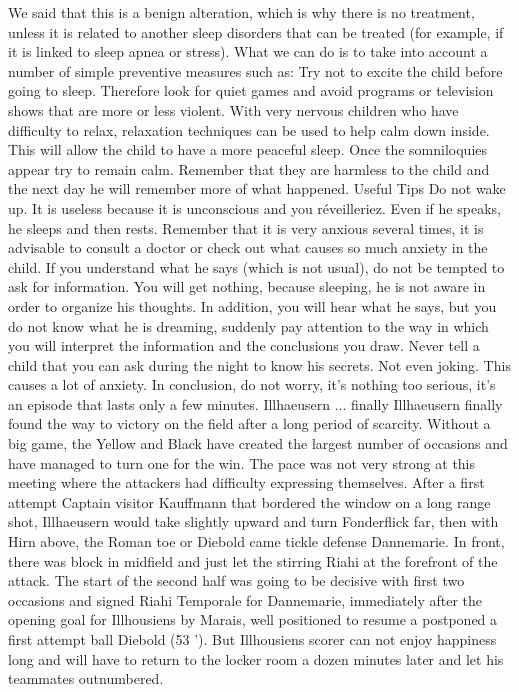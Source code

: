 We said that this is a benign alteration, which is why there is no treatment, unless it is related to another sleep disorders that can be treated (for example, if it is linked to sleep apnea or stress).
What we can do is to take into account a number of simple preventive measures such as:
Try not to excite the child before going to sleep.
Therefore look for quiet games and avoid programs or television shows that are more or less violent.
With very nervous children who have difficulty to relax, relaxation techniques can be used to help calm down inside.
This will allow the child to have a more peaceful sleep.
Once the somniloquies appear try to remain calm.
Remember that they are harmless to the child and the next day he will remember more of what happened.
Useful Tips
Do not wake up.
It is useless because it is unconscious and you réveilleriez.
Even if he speaks, he sleeps and then rests.
Remember that it is very anxious several times, it is advisable to consult a doctor or check out what causes so much anxiety in the child.
If you understand what he says (which is not usual), do not be tempted to ask for information.
You will get nothing, because sleeping, he is not aware in order to organize his thoughts.
In addition, you will hear what he says, but you do not know what he is dreaming, suddenly pay attention to the way in which you will interpret the information and the conclusions you draw.
Never tell a child that you can ask during the night to know his secrets.
Not even joking.
This causes a lot of anxiety.
In conclusion, do not worry, it's nothing too serious, it's an episode that lasts only a few minutes.
Illhaeusern ... finally
Illhaeusern finally found the way to victory on the field after a long period of scarcity.
Without a big game, the Yellow and Black have created the largest number of occasions and have managed to turn one for the win.
The pace was not very strong at this meeting where the attackers had difficulty expressing themselves.
After a first attempt Captain visitor Kauffmann that bordered the window on a long range shot, Illhaeusern would take slightly upward and turn Fonderflick far, then with Hirn above, the Roman toe or Diebold came tickle defense Dannemarie.
In front, there was block in midfield and just let the stirring Riahi at the forefront of the attack.
The start of the second half was going to be decisive with first two occasions and signed Riahi Temporale for Dannemarie, immediately after the opening goal for Illhousiens by Marais, well positioned to resume a postponed a first attempt ball Diebold (53 ').
But Illhousiens scorer can not enjoy happiness long and will have to return to the locker room a dozen minutes later and let his teammates outnumbered.
